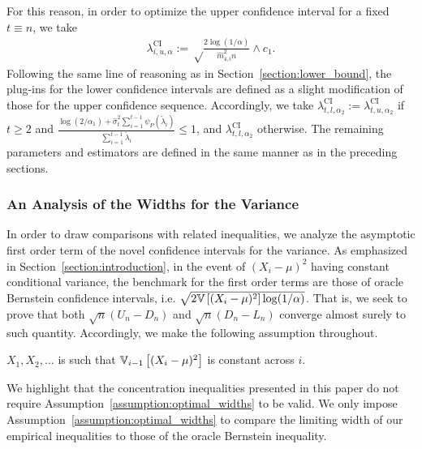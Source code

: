 For this reason, in order to optimize the upper confidence interval for a fixed $t \equiv n$, we take
\begin{align} \label{eq:lambda_ci_definition_upper}
    \lambda_{i, u, \alpha}^{\text{CI}} := \sqrt\frac{2\log(1/\alpha)}{\widehat m_{4, i}^2 n} \wedge c_1.
\end{align}
Following the same line of reasoning as in Section~\ref{section:lower_bound}, the plug-ins for the lower confidence intervals are defined as a slight modification of those for the upper confidence sequence. Accordingly, we take $\lambda_{t,l, \alpha_2}^{\text{CI}} := \lambda_{t,u, \alpha_2}^{\text{CI}}$ if $t \geq 2$ and $\frac{\log(2/\alpha_1) + \hat\sigma^2_{t} \sum_{i=1}^{t-1} \psi_P(\tilde \lambda_i)}{\sum_{i=1}^{t-1} \tilde \lambda_i} \leq 1$, and $\lambda_{t,l, \alpha_2}^{\text{CI}}$ otherwise. The remaining parameters and estimators are defined in the same manner as in the preceding sections.



\subsubsection*{An Analysis of the Widths for the Variance} \label{section:analysis_widths}



In order to draw comparisons with related inequalities, we analyze the asymptotic first order term of the novel confidence intervals for the variance.%
 As emphasized in Section~\ref{section:introduction}, in the event of $(X_i-\mu)^2$ having constant conditional variance, the benchmark for the first order terms are those of oracle Bernstein confidence intervals, i.e. $\sqrt{2 \mathbb{V} \left[ (X_i-\mu)^2\right] \log (1 / \alpha)}$. That is, we seek to prove that both $ \sqrt{n} (U_n - D_n)$ and $\sqrt{n} (D_n - L_n)$ converge almost surely to such quantity. Accordingly, we make the following assumption throughout. 
\begin{assumption} \label{assumption:optimal_widths}
 $X_1, X_2, \ldots$ is such that $\mathbb{V}_{i-1} \left[ (X_i-\mu)^2\right]$ is constant across $i$.
\end{assumption}

We highlight that the concentration inequalities presented in this paper do not require Assumption~\ref{assumption:optimal_widths} to be valid. We only impose Assumption~\ref{assumption:optimal_widths} to compare the limiting width of our empirical inequalities to those of the oracle Bernstein inequality.

